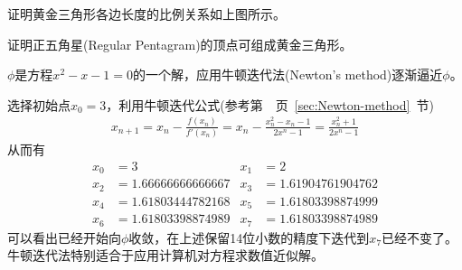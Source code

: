 \begin{question}
  证明黄金三角形各边长度的比例关系如上图所示。
\end{question}

\begin{question}
  证明正五角星(Regular Pentagram)的顶点可组成黄金三角形。
  \begin{center}
  \end{center}
\end{question}

\begin{example}[数值逼近]
  $\phi$是方程$x^2-x-1=0$的一个解，应用牛顿迭代法(Newton's method)逐渐逼近$\phi$。
\end{example}

选择初始点$x_0=3$，利用牛顿迭代公式(参考第~\pageref{sec:Newton-method}~页~\ref{sec:Newton-method}~节)
\begin{align*}
  x_{n+1}=x_n-\frac{f(x_n)}{f'(x_n)}=x_n-\frac{x_n^2-x_n-1}{2x^n-1}=\frac{x_n^2+1}{2x^n-1}
\end{align*}
从而有
\begin{align*}
  x_0&=3 &
  x_1&=2\\
  x_2&=1.66666666666667 &
  x_3&=1.61904761904762\\
  x_4&=1.61803444782168 &
  x_5&=1.61803398874999\\
  x_6&=1.61803398874989 &
  x_7&=1.61803398874989
\end{align*}
可以看出已经开始向$\phi$收敛，在上述保留14位小数的精度下迭代到$x_7$已经不变了。牛顿迭代法特别适合于应用计算机对方程求数值近似解。